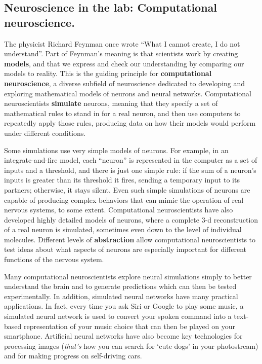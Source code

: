 \documentclass[
]{book}
\begin{document}
\hypertarget{neuroscience-in-the-lab-computational-neuroscience.}{%
\subsection{Neuroscience in the lab: Computational neuroscience.}\label{neuroscience-in-the-lab-computational-neuroscience.}}

The physicist Richard Feynman once wrote ``What I cannot create, I do not understand''. Part of Feynman's meaning is that scientists work by creating \textbf{models}, and that we express and check our understanding by comparing our models to reality. This is the guiding principle for \textbf{computational neuroscience}, a diverse subfield of neuroscience dedicated to developing and exploring mathematical models of neurons and neural networks. Computational neuroscientists \textbf{simulate} neurons, meaning that they specify a set of mathematical rules to stand in for a real neuron, and then use computers to repeatedly apply those rules, producing data on how their models would perform under different conditions.

Some simulations use very simple models of neurons. For example, in an integrate-and-fire model, each ``neuron'' is represented in the computer as a set of inputs and a threshold, and there is just one simple rule: if the sum of a neuron's inputs is greater than its threshold it fires, sending a temporary input to its partners; otherwise, it stays silent. Even such simple simulations of neurons are capable of producing complex behaviors that can mimic the operation of real nervous systems, to some extent. Computational neuroscientists have also developed highly detailed models of neurons, where a complete 3-d reconstruction of a real neuron is simulated, sometimes even down to the level of individual molecules. Different levels of \textbf{abstraction} allow computational neuroscientists to test ideas about what aspects of neurons are especially important for different functions of the nervous system.

Many computational neuroscientists explore neural simulations simply to better understand the brain and to generate predictions which can then be tested experimentally. In addition, simulated neural networks have many practical applications. In fact, every time you ask Siri or Google to play some music, a simulated neural network is used to convert your spoken command into a text-based representation of your music choice that can then be played on your smartphone. Artificial neural networks have also become key technologies for processing images (\emph{that's} how you can search for `cute dogs' in your photostream) and for making progress on self-driving cars.
\end{document}
